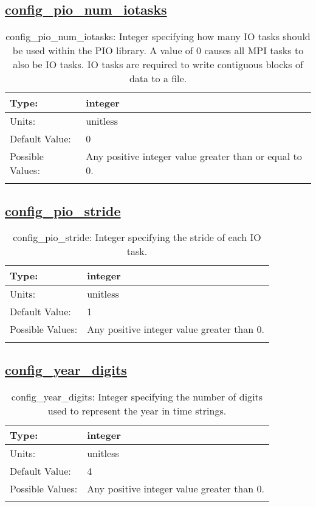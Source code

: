 \subsection[config\_pio\_num\_iotasks]{\hyperref[sec:nm_tab_io]{config\_pio\_num\_iotasks}}
\label{subsec:nm_sec_config_pio_num_iotasks}
\begin{center}
\begin{longtable}{| p{2.0in} || p{4.0in} |}
    \hline
    Type: & integer \\
    \hline
    Units: & \si{unitless} \\
    \hline
    Default Value: & 0 \\
    \hline
    Possible Values: & Any positive integer value greater than or equal to 0. \\
    \hline
    \caption{config\_pio\_num\_iotasks: Integer specifying how many IO tasks should be used within the PIO library. A value of 0 causes all MPI tasks to also be IO tasks. IO tasks are required to write contiguous blocks of data to a file.}
\end{longtable}
\end{center}
\subsection[config\_pio\_stride]{\hyperref[sec:nm_tab_io]{config\_pio\_stride}}
\label{subsec:nm_sec_config_pio_stride}
\begin{center}
\begin{longtable}{| p{2.0in} || p{4.0in} |}
    \hline
    Type: & integer \\
    \hline
    Units: & \si{unitless} \\
    \hline
    Default Value: & 1 \\
    \hline
    Possible Values: & Any positive integer value greater than 0. \\
    \hline
    \caption{config\_pio\_stride: Integer specifying the stride of each IO task.}
\end{longtable}
\end{center}
\subsection[config\_year\_digits]{\hyperref[sec:nm_tab_io]{config\_year\_digits}}
\label{subsec:nm_sec_config_year_digits}
\begin{center}
\begin{longtable}{| p{2.0in} || p{4.0in} |}
    \hline
    Type: & integer \\
    \hline
    Units: & \si{unitless} \\
    \hline
    Default Value: & 4 \\
    \hline
    Possible Values: & Any positive integer value greater than 0. \\
    \hline
    \caption{config\_year\_digits: Integer specifying the number of digits used to represent the year in time strings.}
\end{longtable}
\end{center}

